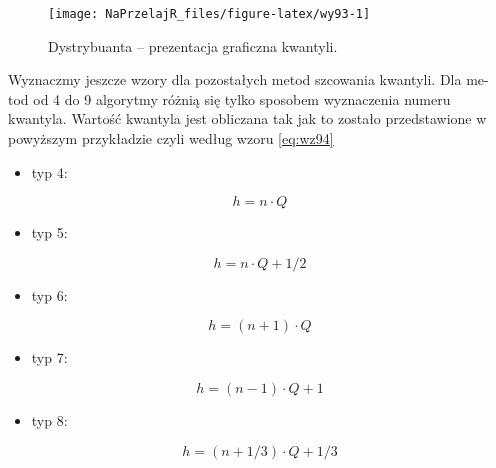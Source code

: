 \documentclass[polish,]{book}
\providecommand{\tightlist}{%
  \setlength{\itemsep}{0pt}\setlength{\parskip}{0pt}}
\begin{document}
\begin{figure}[h]

{\centering \texttt{[image: NaPrzelajR\_files/figure-latex/wy93-1]} 

}

\caption{Dystrybuanta – prezentacja graficzna kwantyli.}\label{fig:wy93}
\end{figure}

Wyznaczmy jeszcze wzory dla pozostałych metod szcowania kwantyli. Dla me-
tod od 4 do 9 algorytmy różnią się tylko sposobem wyznaczenia numeru kwantyla.
Wartość kwantyla jest obliczana tak jak to zostało przedstawione w powyższym
przykładzie czyli według wzoru \eqref{eq:wz94}

\begin{itemize}
\tightlist
\item
  typ 4:
\end{itemize}

\begin{equation}
h=n\cdot Q
\label{eq:wz95}
\end{equation}

\begin{itemize}
\tightlist
\item
  typ 5:
\end{itemize}

\begin{equation}
h=n\cdot Q + 1/2
\label{eq:wz96}
\end{equation}

\begin{itemize}
\tightlist
\item
  typ 6:
\end{itemize}

\begin{equation}
h=(n+1)\cdot Q
\label{eq:wz97}
\end{equation}

\begin{itemize}
\tightlist
\item
  typ 7:
\end{itemize}

\begin{equation}
h=(n-1)\cdot Q + 1
\label{eq:wz98}
\end{equation}

\begin{itemize}
\tightlist
\item
  typ 8:
\end{itemize}

\begin{equation}
h=(n+1/3)\cdot Q + 1/3
\label{eq:wz99}
\end{equation}
\end{document}
